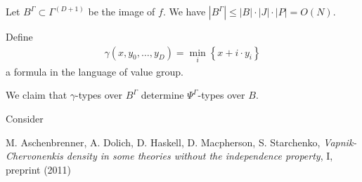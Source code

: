 \documentclass{amsart}
\newcommand{\curly}[1]{\left\{#1\right\}}
\begin{document}
Let $B^\Gamma \subset \Gamma^(D+1)$ be the image of $f$.
We have $|B^\Gamma| \leq |B| \cdot |J| \cdot |P| = O(N)$.

Define
\begin{align*}
	\gamma(x, y_0, \ldots, y_D) = \min_i \curly{x + i \cdot y_i}
\end{align*}
a formula in the language of value group.

We claim that $\gamma$-types over $B^\Gamma$ determine $\Psi^\Gamma$-types over $B$.

Consider 

\begin{thebibliography}{9}
		M. Aschenbrenner, A. Dolich, D. Haskell, D. Macpherson, S. Starchenko,
		\textit{Vapnik-Chervonenkis density in some theories without the independence property}, I, preprint (2011)
\end{thebibliography}
\end{document}
